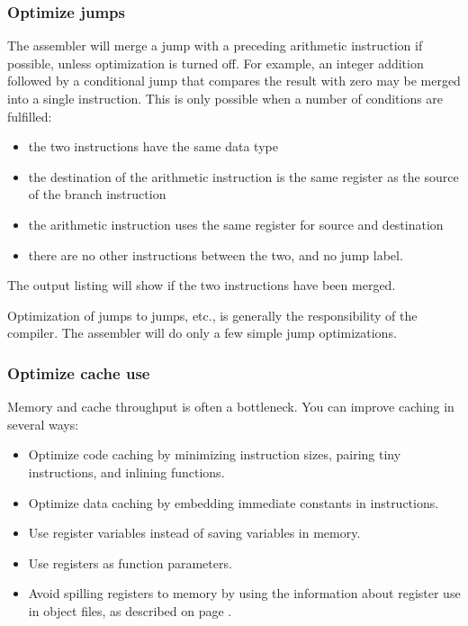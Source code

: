 \documentclass[forwardcom.tex]{subfiles}
\begin{document}
\subsubsection{Optimize jumps}
The assembler will merge a jump with a preceding arithmetic instruction if possible, unless optimization is turned off. For example, an integer addition followed by a conditional jump that compares the result with zero may be merged into a single instruction. This is only possible when a number of conditions are fulfilled: 
\begin{itemize}
\item the two instructions have the same data type
\item the destination of the arithmetic instruction is the same register as the source of the branch instruction
\item the arithmetic instruction uses the same register for source and destination
\item there are no other instructions between the two, and no jump label.
\end{itemize}

The output listing will show if the two instructions have been merged.
\vspace{2mm}

Optimization of jumps to jumps, etc., is generally the responsibility of the compiler. The assembler will do only a few simple jump optimizations.


\subsubsection{Optimize cache use}
Memory and cache throughput is often a bottleneck. You can improve caching 
in several ways:

\begin{itemize}
\item Optimize code caching by minimizing instruction sizes, pairing tiny instructions, and inlining functions.
\item Optimize data caching by embedding immediate constants in instructions.
\item Use register variables instead of saving variables in memory.
\item Use registers as function parameters.
\item Avoid spilling registers to memory by using the information about register use in object files, as described on page \pageref{registerUsageConvention}.
\end{itemize}
\end{document}
